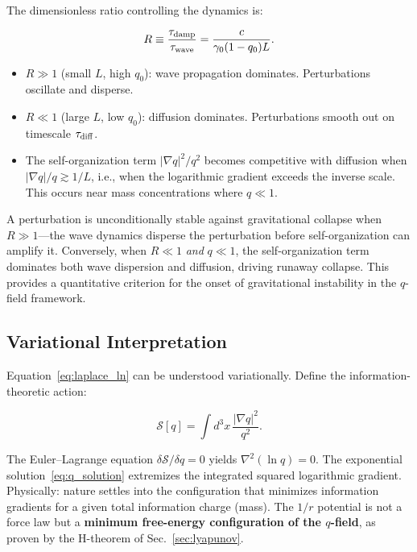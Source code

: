 \documentclass[aps,prd,twocolumn,showpacs,superscriptaddress,preprintnumbers]{revtex4-2}
\begin{document}
The dimensionless ratio controlling the dynamics is:

\begin{equation}
R \equiv \frac{\tau_{\rm damp}}{\tau_{\rm wave}} = \frac{c}{\gamma_0(1-q_0)L}.
\label{eq:stability_R}
\end{equation}

\begin{itemize}
    \item $R\gg1$ (small $L$, high $q_0$): wave propagation dominates. Perturbations oscillate and disperse.
    \item $R\ll1$ (large $L$, low $q_0$): diffusion dominates. Perturbations smooth out on timescale $\tau_{\rm diff}$.
    \item The self-organization term $|\nabla q|^2/q^2$ becomes competitive with diffusion when $|\nabla q|/q \gtrsim 1/L$, i.e., when the logarithmic gradient exceeds the inverse scale. This occurs near mass concentrations where $q\ll1$.
\end{itemize}

A perturbation is unconditionally stable against gravitational collapse when $R\gg1$---the wave dynamics disperse the perturbation before self-organization can amplify it.
Conversely, when $R\ll1$ \emph{and} $q\ll1$, the self-organization term dominates both wave dispersion and diffusion, driving runaway collapse.
This provides a quantitative criterion for the onset of gravitational instability in the $q$-field framework.

\subsection{Variational Interpretation}

Equation~\eqref{eq:laplace_ln} can be understood variationally.
Define the information-theoretic action:

\begin{equation}
\mathcal{S}[q] = \int d^3x \, \frac{|\nabla q|^2}{q^2}.
\label{eq:action}
\end{equation}

The Euler--Lagrange equation $\delta\mathcal{S}/\delta q=0$ yields $\nabla^2(\ln q)=0$.
The exponential solution~\eqref{eq:q_solution} extremizes the integrated squared logarithmic gradient.
Physically: nature settles into the configuration that minimizes information gradients for a given total information charge (mass).
The $1/r$ potential is not a force law but a \textbf{minimum free-energy configuration of the $q$-field}, as proven by the H-theorem of Sec.~\ref{sec:lyapunov}.
\end{document}
